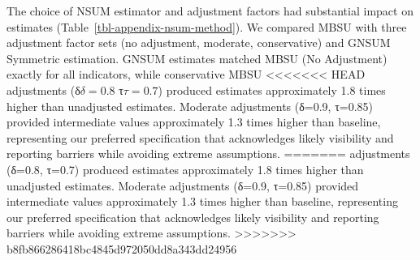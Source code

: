 \documentclass[
  12pt,
  letterpaper,
  DIV=11,
  numbers=noendperiod]{scrartcl}
\theoremstyle{plain}
\theoremstyle{definition}
\begin{document}
{The choice of NSUM estimator and adjustment factors had substantial
impact on estimates (Table~\ref{tbl-appendix-nsum-method}). We compared
MBSU with three adjustment factor sets (no adjustment, moderate,
conservative) and GNSUM Symmetric estimation. GNSUM estimates matched
MBSU (No Adjustment) exactly for all indicators, while conservative MBSU
<<<<<<< HEAD
adjustments (δ\(\delta=0.8\) τ\(\tau=0.7\)) produced estimates
approximately 1.8 times higher than unadjusted estimates. Moderate
adjustments (δ=0.9, τ=0.85) provided intermediate values approximately
1.3 times higher than baseline, representing our preferred specification
that acknowledges likely visibility and reporting barriers while
avoiding extreme assumptions.
=======
adjustments (δ=0.8, τ=0.7) produced estimates approximately 1.8 times
higher than unadjusted estimates. Moderate adjustments (δ=0.9, τ=0.85)
provided intermediate values approximately 1.3 times higher than
baseline, representing our preferred specification that acknowledges
likely visibility and reporting barriers while avoiding extreme
assumptions.
>>>>>>> b8fb866286418bc4845d972050dd8a343dd24956

\begin{table}

\caption{\label{tbl-appendix-nsum-method}Sensitivity Analysis: NSUM
Method and Adjustment Factor Comparison. All estimates use neighborhood
bootstrap, SS weights, and N=980,000. Source: Authors' Own Work.}

\centering{

\centering\begingroup\fontsize{8}{10}\selectfont

}
\end{table}}
\end{document}

